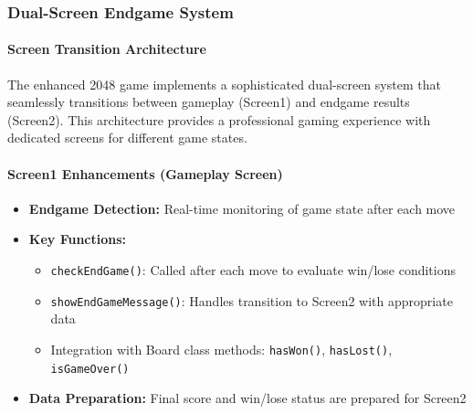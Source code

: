 \documentclass[12pt,a4paper]{article}
\begin{document}
\subsubsection{Dual-Screen Endgame System}

\paragraph{Screen Transition Architecture}
The enhanced 2048 game implements a sophisticated dual-screen system that seamlessly transitions between gameplay (Screen1) and endgame results (Screen2). This architecture provides a professional gaming experience with dedicated screens for different game states.

\paragraph{Screen1 Enhancements (Gameplay Screen)}
\begin{itemize}[leftmargin=*]
    \item \textbf{Endgame Detection:} Real-time monitoring of game state after each move
    \item \textbf{Key Functions:}
    \begin{itemize}
        \item \texttt{checkEndGame()}: Called after each move to evaluate win/lose conditions
        \item \texttt{showEndGameMessage()}: Handles transition to Screen2 with appropriate data
        \item Integration with Board class methods: \texttt{hasWon()}, \texttt{hasLost()}, \texttt{isGameOver()}
    \end{itemize}
    \item \textbf{Data Preparation:} Final score and win/lose status are prepared for Screen2
\end{itemize}
\end{document}
